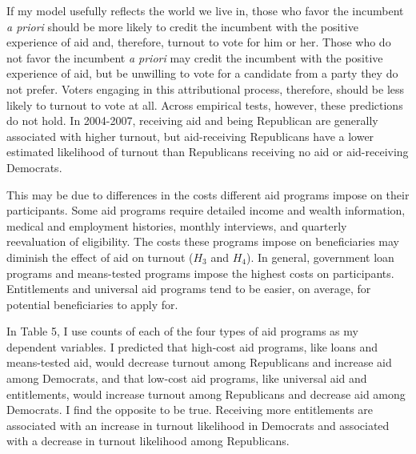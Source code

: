 \documentclass[12pt]{paper}
\begin{document}
If my model usefully reflects the world we live in, those who favor the incumbent \textit{a priori} should be more likely to credit the incumbent with the positive experience of aid and, therefore, turnout to vote for him or her. Those who do not favor the incumbent \textit{a priori} may credit the incumbent with the positive experience of aid, but be unwilling to vote for a candidate from a party they do not prefer. Voters engaging in this attributional process, therefore, should be less likely to turnout to vote at all. Across empirical tests, however, these predictions do not hold. In 2004-2007, receiving aid and being Republican are generally associated with higher turnout, but aid-receiving Republicans have a lower estimated likelihood of turnout than Republicans receiving no aid or aid-receiving Democrats.

This may be due to differences in the costs different aid programs impose on their participants. Some aid programs require detailed income and wealth information, medical and employment histories, monthly interviews, and quarterly reevaluation of eligibility. The costs these programs impose on beneficiaries may diminish the effect of aid on turnout ($H_3$ and $H_4$). In general, government loan programs and means-tested programs impose the highest costs on participants. Entitlements and universal aid programs tend to be easier, on average, for potential beneficiaries to apply for.

In Table 5, I use counts of each of the four types of aid programs as my dependent variables. I predicted that high-cost aid programs, like loans and means-tested aid, would decrease turnout among Republicans and increase aid among Democrats, and that low-cost aid programs, like universal aid and entitlements, would increase turnout among Republicans and decrease aid among Democrats. I find the opposite to be true. Receiving more entitlements are associated with an increase in turnout likelihood in Democrats and associated with a decrease in turnout likelihood among Republicans.
\end{document}
